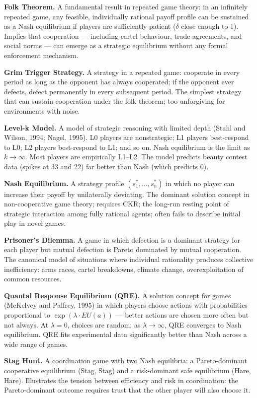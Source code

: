 \documentclass[12pt, letterpaper]{article}
\begin{document}
\textbf{Folk Theorem.} A fundamental result in repeated game theory: in an infinitely repeated game, any feasible, individually rational payoff profile can be sustained as a Nash equilibrium if players are sufficiently patient ($\delta$ close enough to 1). Implies that cooperation --- including cartel behaviour, trade agreements, and social norms --- can emerge as a strategic equilibrium without any formal enforcement mechanism.

\textbf{Grim Trigger Strategy.} A strategy in a repeated game: cooperate in every period as long as the opponent has always cooperated; if the opponent ever defects, defect permanently in every subsequent period. The simplest strategy that can sustain cooperation under the folk theorem; too unforgiving for environments with noise.

\textbf{Level-k Model.} A model of strategic reasoning with limited depth (Stahl and Wilson, 1994; Nagel, 1995). L0 players are nonstrategic; L1 players best-respond to L0; L2 players best-respond to L1; and so on. Nash equilibrium is the limit as $k \to \infty$. Most players are empirically L1--L2. The model predicts beauty contest data (spikes at 33 and 22) far better than Nash (which predicts 0).

\textbf{Nash Equilibrium.} A strategy profile $(s_1^*, \ldots, s_n^*)$ in which no player can increase their payoff by unilaterally deviating. The dominant solution concept in non-cooperative game theory; requires CKR; the long-run resting point of strategic interaction among fully rational agents; often fails to describe initial play in novel games.

\textbf{Prisoner's Dilemma.} A game in which defection is a dominant strategy for each player but mutual defection is Pareto dominated by mutual cooperation. The canonical model of situations where individual rationality produces collective inefficiency: arms races, cartel breakdowns, climate change, overexploitation of common resources.

\textbf{Quantal Response Equilibrium (QRE).} A solution concept for games (McKelvey and Palfrey, 1995) in which players choose actions with probabilities proportional to $\exp(\lambda \cdot EU(a))$ --- better actions are chosen more often but not always. At $\lambda = 0$, choices are random; as $\lambda \to \infty$, QRE converges to Nash equilibrium. QRE fits experimental data significantly better than Nash across a wide range of games.

\textbf{Stag Hunt.} A coordination game with two Nash equilibria: a Pareto-dominant cooperative equilibrium (Stag, Stag) and a risk-dominant safe equilibrium (Hare, Hare). Illustrates the tension between efficiency and risk in coordination: the Pareto-dominant outcome requires trust that the other player will also choose it.
\end{document}

